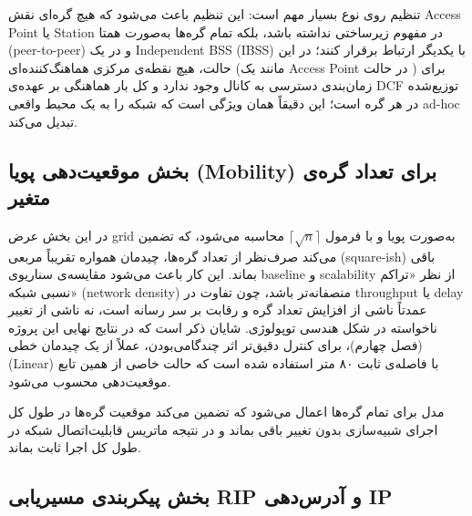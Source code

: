 \documentclass{article}
\begin{document}
	تنظیم  روی نوع  بسیار مهم است: این تنظیم باعث می‌شود که هیچ گره‌ای نقش Access Point یا Station در مفهوم زیرساختی 
	نداشته باشد، بلکه تمام گره‌ها به‌صورت همتا (peer-to-peer) و در یک Independent BSS (IBSS) با یکدیگر ارتباط برقرار کنند؛ در این حالت، هیچ نقطه‌ی مرکزی هماهنگ‌کننده‌ای (مانند یک Access Point در حالت ) برای زمان‌بندی دسترسی به کانال وجود ندارد و کل بار هماهنگی بر عهده‌ی DCF توزیع‌شده در هر گره است؛ این دقیقاً همان ویژگی است که شبکه را به یک محیط واقعی ad-hoc تبدیل می‌کند.
	
	\subsection{بخش موقعیت‌دهی پویا (Mobility) برای تعداد گره‌ی متغیر}
	
	\lr{}
	
	در این بخش عرض grid به‌صورت پویا و با فرمول $\lceil\sqrt{n}\rceil$ محاسبه می‌شود، که تضمین می‌کند صرف‌نظر از تعداد گره‌ها، چیدمان همواره تقریباً مربعی (square-ish) باقی بماند. این کار باعث می‌شود مقایسه‌ی سناریوی baseline و scalability از نظر «تراکم نسبی شبکه» (network density) منصفانه‌تر باشد، چون تفاوت در throughput یا delay عمدتاً ناشی از افزایش تعداد گره و رقابت بر سر رسانه است، نه ناشی از تغییر ناخواسته در شکل هندسی توپولوژی. شایان ذکر است که در نتایج نهایی این پروژه (فصل چهارم)، برای کنترل دقیق‌تر اثر چندگامی‌بودن، عملاً از یک چیدمان خطی (Linear) با فاصله‌ی ثابت ۸۰ متر استفاده شده است که حالت خاصی از همین تابع موقعیت‌دهی محسوب می‌شود.
	
	مدل  برای تمام گره‌ها اعمال می‌شود که تضمین می‌کند موقعیت گره‌ها در طول کل اجرای شبیه‌سازی بدون تغییر باقی بماند و در نتیجه ماتریس قابلیت‌اتصال 
	شبکه در طول کل اجرا ثابت بماند.
	
	\subsection{بخش پیکربندی مسیریابی RIP و آدرس‌دهی IP}
	
	\lr{}
	
\end{document}
